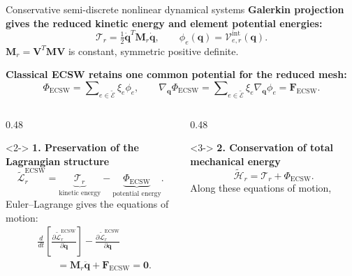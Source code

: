 \documentclass[aspectratio=169]{beamer}
\newcommand{\vect}[1]{\boldsymbol{#1}}
\newcommand{\matr}[1]{\boldsymbol{#1}}
\begin{document}
\begin{frame}{Conservative semi-discrete nonlinear dynamical systems}
\hypertarget<3>{bmecsw-classical-mechanics}{}
\hypertarget<2>{bmecsw-euler-lagrange-main}{}
\fontsize{9.5}{11}\selectfont
\setlength{\parskip}{0pt}
\setlength{\abovedisplayskip}{1pt}
\setlength{\belowdisplayskip}{1pt}
\setlength{\abovedisplayshortskip}{1pt}
\setlength{\belowdisplayshortskip}{1pt}
\textbf{Galerkin projection gives the reduced kinetic energy and element potential energies:}
\[
  \mathcal T_r=\tfrac12\dot{\vect{q}}^T\matr{M}_r\dot{\vect{q}},
  \qquad \phi_e(\vect{q})=\mathcal V_{e,r}^{\mathrm{int}}(\vect{q}).
\]
{\fontsize{8}{9}\selectfont $\matr{M}_r=\matr{V}^T\matr{M}\matr{V}$ is constant, symmetric positive definite.}\par
\vspace{3pt}
\textbf{Classical ECSW retains one common potential for the reduced mesh:}
\[
  \Phi_{\mathrm{ECSW}}=\sum\nolimits_{e\in\widetilde{\mathcal E}}\xi_e\phi_e,
  \qquad \nabla_{\vect{q}}\Phi_{\mathrm{ECSW}}
  =\sum\nolimits_{e\in\widetilde{\mathcal E}}\xi_e\nabla_{\vect{q}}\phi_e
  =\vect{F}_{\mathrm{ECSW}}.
\]
\vspace{2pt}
\begin{columns}[T,onlytextwidth]
\begin{column}{0.48\textwidth}
\begin{uncoverenv}<2->
\textbf{1. Preservation of the Lagrangian structure}
\[
  \widetilde{\mathcal L}_r^{\mathrm{ECSW}}
  =\underbrace{\mathcal T_r}_{\text{kinetic energy}}
  -\underbrace{\Phi_{\mathrm{ECSW}}}_{\text{potential energy}}.
\]
Euler--Lagrange gives the equations of motion:
\[
\begin{aligned}
  &\frac{d}{dt}\left[
    \frac{\partial\widetilde{\mathcal L}_r^{\mathrm{ECSW}}}
         {\partial\dot{\vect{q}}}\right]
   -\frac{\partial\widetilde{\mathcal L}_r^{\mathrm{ECSW}}}{\partial\vect{q}}\\[1pt]
  &\qquad=\matr{M}_r\ddot{\vect{q}}+\vect{F}_{\mathrm{ECSW}}=\vect{0}.
\end{aligned}
\]
{\fontsize{8}{9}\selectfont
\hfill\hyperlink{bmecsw-mechanical-derivation}{}}
\end{uncoverenv}
\end{column}
\begin{column}{0.48\textwidth}
\begin{uncoverenv}<3->
\textbf{2. Conservation of total mechanical energy}
\[
  \widetilde{\mathcal H}_r=\mathcal T_r+\Phi_{\mathrm{ECSW}}.
\]
Along these equations of motion,

\end{uncoverenv}
\end{column}
\end{columns}
\end{frame}
\end{document}
